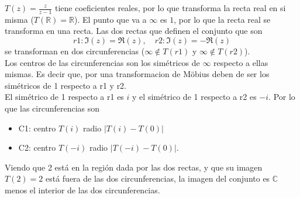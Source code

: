 {
    $T(z) = \frac{z}{z - 1}$ tiene coeficientes reales, por lo que transforma la recta real en si misma ($T(\mathbb{R}) = \mathbb{R}$).
    El punto que va a $\infty$ es $1$, por lo que la recta real se transforma en una recta. Las dos rectas que definen el conjunto
    que son 
    \[
    r1: \Im(z)=\Re(z), \quad
    r2: \Im(z)=-\Re(z)
    \] 
    se transforman en dos circunferencias ($\infty \notin T(r1)$ y $\infty \notin T(r2)$).
    \\
Los centros de las circunferencias son los simétricos de $\infty$ respecto a ellas mismas. Es decir que, por una transformacion de Möbius deben de ser los simétricos de 1 respecto a r1 y r2.
    \\
    El simétrico de 1 respecto a r1 es $i$ y el simétrico de 1 respecto a r2 es $-i$. Por lo que las circunferencias son
    \begin{itemize}
        \item C1: centro $T(i)$ radio $|T(i)-T(0)|$ 
        \item C2: centro $T(-i)$ radio $|T(-i)-T(0)|$.
    \end{itemize} 
    Viendo que 2 está en la región dada por las dos rectas, y que su imagen $T(2) = 2$ está 
    fuera de las dos circunferencias, la imagen del conjunto es $\mathbb{C}$ menos el interior de las dos circunferencias.

    }
